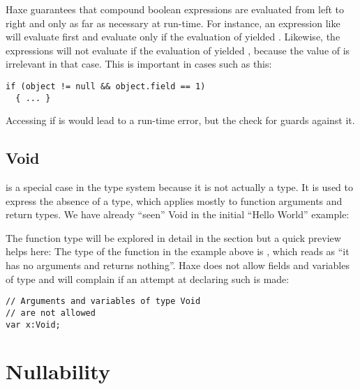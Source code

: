 Haxe guarantees that compound boolean expressions are evaluated from left to right and only as far as necessary at run-time. For instance, an expression like  will evaluate  first and evaluate  only if the evaluation of  yielded . Likewise, the expressions  will not evaluate  if the evaluation of  yielded , because the value of  is irrelevant in that case. This is important in cases such as this:

\begin{lstlisting}
if (object != null && object.field == 1)
  { ... }
\end{lstlisting}

Accessing  if  is  would lead to a run-time error, but the check for  guards against it.




\subsection{Void}
\label{types-void}


 is a special case in the type system because it is not actually a type. It is used to express the absence of a type, which applies mostly to function arguments and return types.
We have already ``seen'' Void in the initial ``Hello World'' example:


The function type will be explored in detail in the section  but a quick preview helps here: The type of the function  in the example above is , which reads as ``it has no arguments and returns nothing''.
Haxe does not allow fields and variables of type  and will complain if an attempt at declaring such is made:

\begin{lstlisting}
// Arguments and variables of type Void
// are not allowed
var x:Void;
\end{lstlisting}



\section{Nullability}
\label{types-nullability}

